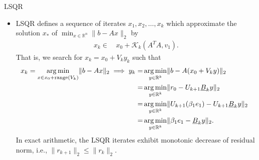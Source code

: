 \documentclass[t,usepdftitle=false]{beamer}
\begin{document}
\begin{frame}{LSQR}
\begin{itemize}
\item LSQR defines a sequence of iterates $x_1,x_2,\dots,x_k$ which approximate the solution $x_*$ of $\min_{x\in\mathbb{R}^n}\|b-Ax\|_2$ by
\begin{align*}
x_k\in&\,x_0+\mathcal{K}_k(A^TA,v_1).
\end{align*}
That is, we search for $x_k=x_0+V_ky_k$ such that
\begin{align*}
\hspace{-.2cm}
x_k=\underset{x\in x_0+\text{range}(V_k)}{\arg\min}\|b-Ax\|_2
\implies
y_k=&\,\underset{y\in\mathbb{R}^k}{\arg\min}\|b-A(x_0+V_ky)\|_2\\
=&\,\underset{y\in\mathbb{R}^k}{\arg\min}\|r_0-U_{k+1}\underline{B}_ky\|_2\\
=&\,\underset{y\in\mathbb{R}^k}{\arg\min}\|U_{k+1}(\beta_1e_1)-U_{k+1}\underline{B}_ky\|_2\\
=&\,\underset{y\in\mathbb{R}^k}{\arg\min}\|\beta_1e_1-\underline{B}_ky\|_2.
\end{align*}
In exact arithmetic, the LSQR iterates exhibit monotonic decrease of residual norm, i.e., $\|r_{k+1}\|_2\leq\|r_k\|_2$.
\end{itemize}
\end{frame}
\end{document}
